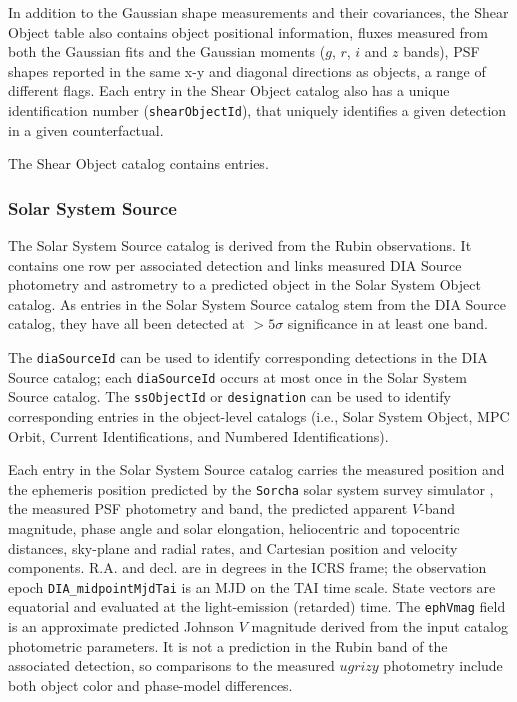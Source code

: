 In addition to the Gaussian shape measurements and their covariances, the Shear Object table also contains object positional information, fluxes measured from both the Gaussian fits and the Gaussian moments ($g$, $r$, $i$ and $z$ bands), \gls{PSF} shapes reported in the same x-y and diagonal directions as objects, a range of different flags.
Each entry in the Shear Object catalog also has a unique identification number (\texttt{shearObjectId}), that uniquely identifies a given detection in a given counterfactual.

The Shear Object catalog contains \nshearobjects entries.

\subsubsection{Solar System Source}
\label{sssec:SSSource}
The Solar System Source catalog is derived from the Rubin observations.
It contains one row per associated detection and links measured DIA Source photometry and \gls{astrometry} to a predicted object in the Solar System Object catalog.
As entries in the Solar System Source catalog stem from the \gls{DIA} Source catalog, they have all been detected at $>5\sigma$ significance in at least one band.

The \texttt{diaSourceId} can be used to identify corresponding detections in the \gls{DIA} Source catalog; each \texttt{diaSourceId} occurs at most once in the Solar System Source catalog.
The \texttt{ssObjectId} or \texttt{designation} can be used to identify corresponding entries in the object-level catalogs (i.e., Solar System Object, \gls{MPC} Orbit, Current Identifications, and Numbered Identifications).

Each entry in the Solar System Source catalog carries the measured position and the ephemeris position predicted by the \texttt{Sorcha} solar system survey simulator \citep[][]{2025AJ....170..100M,2025AJ....170...97H}, the measured PSF photometry and band, the predicted apparent $V$-band magnitude, phase angle and solar elongation, heliocentric and topocentric distances, sky-plane and radial rates, and Cartesian position and velocity components.
R.A. and decl. are in degrees in the ICRS frame; the observation epoch \texttt{DIA\_midpointMjdTai} is an MJD on the \gls{TAI} time scale.
State vectors are equatorial and evaluated at the light-emission (retarded) time.
The \texttt{ephVmag} field is an approximate predicted Johnson $V$ magnitude derived from the input catalog photometric parameters.
It is not a prediction in the Rubin band of the associated detection, so comparisons to the measured $ugrizy$ photometry include both object color and phase-model differences.

